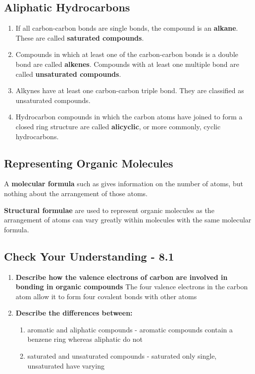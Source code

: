 	
	\subsection{Aliphatic Hydrocarbons}
	
		\begin{enumerate}
			\item If all carbon-carbon bonds are single bonds, the compound is an \textbf{alkane}. These are called \textbf{saturated compounds}.
			\item Compounds in which at least one of the carbon-carbon bonds is a double bond are called \textbf{alkenes}. Compounds with at least one multiple bond are called \textbf{unsaturated compounds}.
			\item Alkynes have at least one carbon-carbon triple bond. They are classified as unsaturated compounds.
			\item Hydrocarbon compounds in which the carbon atoms have joined to form a closed ring structure are called \textbf{alicyclic}, or more commonly, cyclic hydrocarbons.
		\end{enumerate}

	\subsection{Representing Organic Molecules}
	
		A \textbf{molecular formula} such as  gives information on the number of atoms, but nothing about the arrangement of those atoms.

\textbf{Structural formulae} are used to represent organic molecules as the arrangement of atoms can vary greatly within molecules with the same molecular formula.

	\subsection{Check Your Understanding - 8.1}
	
		\begin{enumerate}
			\item \textbf{Describe how the valence electrons of carbon are involved in bonding in organic compounds}
				\subitem The four valence electrons in the carbon atom allow it to form four covalent bonds with other atoms

			\item \textbf{Describe the differences between:}
				\begin{enumerate}
					\item aromatic and aliphatic compounds - aromatic compounds contain a benzene ring whereas aliphatic do not
					\item saturated and unsaturated compounds - saturated only single, unsaturated have varying
				\end{enumerate}
		\end{enumerate}

